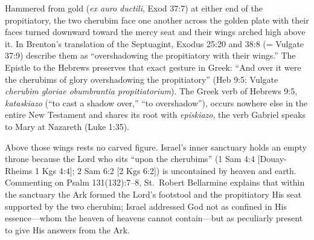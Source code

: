 Hammered from gold (\textit{ex auro ductili}, Exod 37:7) at either end of the propitiatory, the two cherubim face one another across the golden plate with their faces turned downward toward the mercy seat and their wings arched high above it. In Brenton's translation of the Septuagint, Exodus 25:20 and 38:8 (= Vulgate 37:9) describe them as ``overshadowing the propitiatory with their wings.'' The Epistle to the Hebrews preserves that exact gesture in Greek: ``And over it were the cherubims of glory overshadowing the propitiatory'' (Heb 9:5; Vulgate \textit{cherubim gloriae obumbrantia propitiatorium}). The Greek verb of Hebrews 9:5, \textit{kataskiazo} (``to cast a shadow over,'' ``to overshadow''), occurs nowhere else in the entire New Testament and shares its root with \textit{episkiazo}, the verb Gabriel speaks to Mary at Nazareth (Luke 1:35).

Above those wings rests no carved figure. Israel's inner sanctuary holds an empty throne because the Lord who sits ``upon the cherubims'' (1 Sam 4:4 [Douay-Rheims 1 Kgs 4:4]; 2 Sam 6:2 [2 Kgs 6:2]) is uncontained by heaven and earth. Commenting on Psalm 131(132):7--8, St.\ Robert Bellarmine explains that within the sanctuary the Ark formed the Lord's footstool and the propitiatory His seat supported by the two cherubim; Israel addressed God not as confined in His essence---whom the heaven of heavens cannot contain---but as peculiarly present to give His answers from the Ark.


